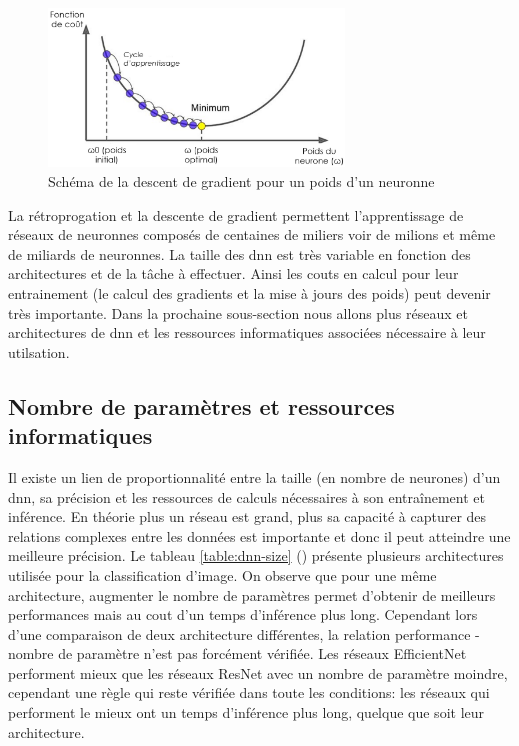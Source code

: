 \begin{figure}[!htbp]
 \centering
 \includegraphics[width=0.7\textwidth]{figures/gradient_descent.png}
 \caption[Schéma de la descente de gradient pour un poids d'un neuronne]{Schéma de la descent de gradient pour un poids d'un neuronne}
 \label{fig:grad_descent}
\end{figure}

La rétroprogation et la descente de gradient permettent l'apprentissage de réseaux de neuronnes composés de centaines de miliers voir de milions et même de miliards de neuronnes. La taille des \gls{dnn} est très variable en fonction des architectures et de la tâche à effectuer. Ainsi les couts en calcul pour leur entrainement (le calcul des gradients et la mise à jours des poids) peut devenir très importante. Dans la prochaine sous-section nous allons plus réseaux et architectures de \gls{dnn} et les ressources informatiques associées nécessaire à leur utilsation.

\subsection{Nombre de paramètres et ressources informatiques}
Il existe un lien de proportionnalité entre la taille (en nombre de neurones) d'un \gls{dnn}, sa précision et les ressources de calculs nécessaires à son entraînement et inférence. En théorie plus un réseau est grand, plus sa capacité à capturer des relations complexes entre les données est importante et donc il peut atteindre une meilleure précision. Le tableau \ref{table:dnn-size} (\cite{chollet_keras_2023}) présente plusieurs architectures utilisée pour la classification d'image. On observe que pour une même architecture, augmenter le nombre de paramètres permet d'obtenir de meilleurs performances mais au cout d'un temps d'inférence plus long. Cependant lors d'une comparaison de deux architecture différentes, la relation performance - nombre de paramètre n'est pas forcément vérifiée. Les réseaux EfficientNet performent mieux que les réseaux ResNet avec un nombre de paramètre moindre, cependant une règle qui reste vérifiée dans toute les conditions: les réseaux qui performent le mieux ont un temps d'inférence plus long, quelque que soit leur architecture.

